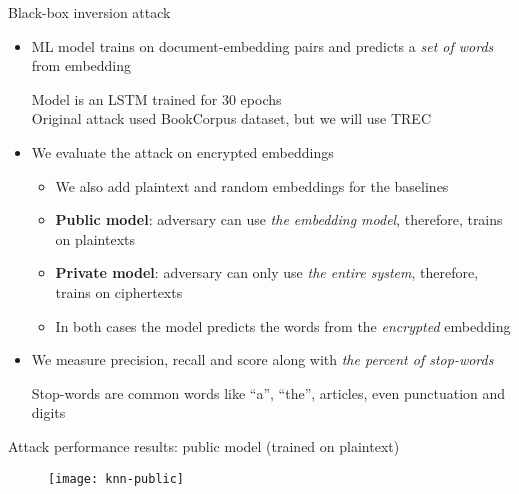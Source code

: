 	\begin{frame}{Black-box inversion attack \cite{embedding-attacks}}

		\begin{itemize}
			\item<1->
				ML model trains on document-embedding pairs and predicts a \emph{set of words} from embedding \\
				\begin{small}
					\indent{} Model is an LSTM trained for 30 epochs \\
					\indent{} Original attack used BookCorpus \cite{bookcorpus} dataset, but we will use TREC
				\end{small}

			\item<2->
				We evaluate the attack on encrypted embeddings
				\begin{itemize}
					\item We also add plaintext and random embeddings for the baselines
					\item \textbf{Public model}: adversary can use \emph{the embedding model}, therefore, trains on plaintexts
					\item \textbf{Private model}: adversary can only use \emph{the entire system}, therefore, trains on ciphertexts
					\item In both cases the model predicts the words from the \emph{encrypted} embedding
				\end{itemize}

			\item<3->
				We measure precision, recall and \FOne{} score along with \emph{the percent of stop-words} \\
				\begin{small}
					\indent{} Stop-words are common words like ``a'', ``the'', articles, even punctuation and digits
				\end{small}

		\end{itemize}

	\end{frame}

	\begin{frame}{Attack performance results: public model (trained on plaintext)}

		\begin{figure}[h]
			\centering
			\texttt{[image: knn-public]}
		\end{figure}

	\end{frame}

